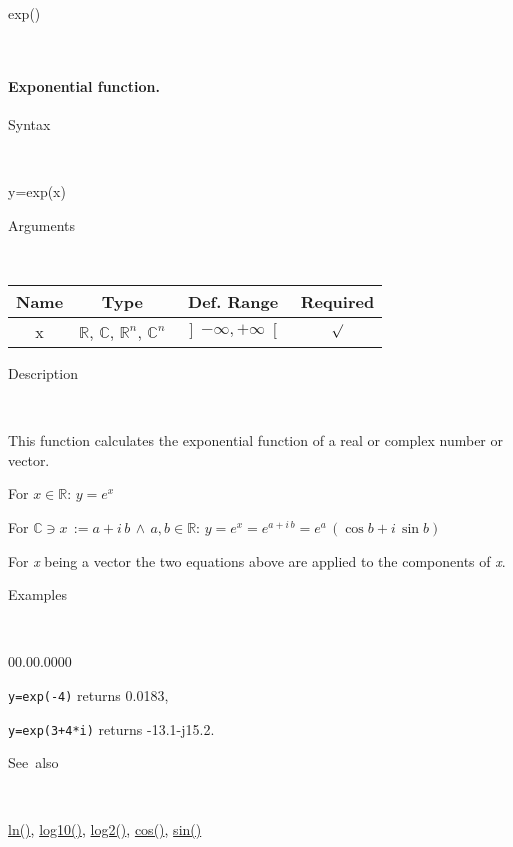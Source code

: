 \newpage
{}

\begin{description}
\item [\hypertarget{exp}{}{\Large exp()}]~{\Large \par}
\end{description}

\paragraph{\label{par:Exponential-function}Exponential function.}

\begin{description}
\item [Syntax]~
\end{description}
y=exp(x)

\begin{description}
\item [Arguments]~
\end{description}
\begin{tabular}{|c|c|c|c|}
\hline 
Name&
Type&
Def. Range&
Required\tabularnewline
\hline
\hline 
x&
$\mathbb{R}$, $\mathbb{C}$, $\mathbb{R}^{n}$, $\mathbb{C}^{n}$&
$\left]-\infty,+\infty\right[$&
$\surd$\tabularnewline
\hline
\end{tabular}

\begin{description}
\item [Description]~
\end{description}
This function calculates the exponential function of a real or complex
number or vector.

\medskip{}
For $x\in\mathbb{R}$: $y=e^{x}$ 
\medskip{}

For $\mathbb{\mathbb{C}}\ni x\,:=a+i\, b\,\wedge\, a,b\in\mathbb{R}$:
$y=e^{x}=e^{a+i\, b}=e^{a}\,\left(\cos b+i\,\sin b\right)$
\medskip{}

For \textit{x} being a vector the two equations above are
applied to the components of \textit{x}.

\begin{description}
\item [Examples]~
\end{description}
\begin{lyxlist}{00.00.0000}
\item [\texttt{y=exp(-4)}]returns 0.0183,
\item [\texttt{y=exp(3+4{*}i)}]returns -13.1-j15.2.
\end{lyxlist}
\begin{description}
\item [See~also]~
\end{description}
\textcolor{blue}{\hyperlink{ln}{ln()}}\textcolor{black}{,} \textcolor{blue}{\hyperlink{log10}{log10()}}\textcolor{black}{,}
\textcolor{blue}{\hyperlink{log2}{log2()}}\textcolor{black}{,} \textcolor{blue}{\hyperlink{cos}{cos()}}\textcolor{black}{,}
\textcolor{blue}{\hyperlink{sin}{sin()}}


